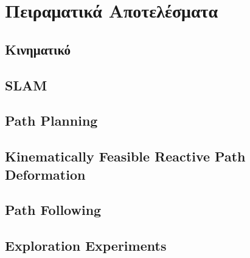 
\chapter{Πειραματικά Αποτελέσματα} %

\label{Chapter5} %


\section{Κινηματικό}


\section{SLAM}


\section{Path Planning}


\section{Kinematically Feasible Reactive Path Deformation}


\section{Path Following}


\section{Exploration Experiments}